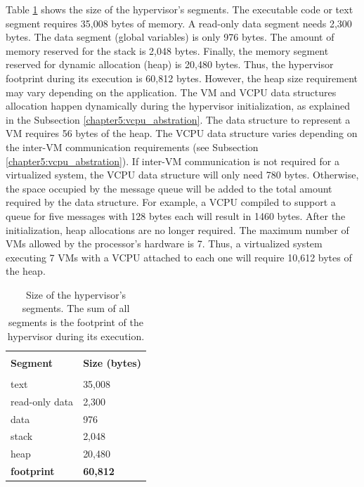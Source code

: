 Table \ref{table6:segments} shows the size of the hypervisor's segments. The executable code or text segment requires 35,008 bytes of memory. A read-only data segment needs 2,300 bytes. The data segment (global variables) is only 976 bytes. The amount of memory reserved for the stack is 2,048 bytes. Finally, the memory segment reserved for dynamic allocation (heap) is 20,480 bytes. Thus, the hypervisor footprint during its execution is 60,812 bytes. However, the heap size requirement may vary depending on the application. The VM and VCPU data structures allocation happen dynamically during the hypervisor initialization, as explained in the Subsection \ref{chapter5:vcpu_abstration}. The data structure to represent a VM requires 56 bytes of the heap. The VCPU data structure varies depending on the inter-VM communication requirements (see Subsection \ref{chapter5:vcpu_abstration}). If inter-VM communication is not required for a virtualized system, the VCPU data structure will only need 780 bytes. Otherwise, the space occupied by the message queue will be added to the total amount required by the data structure. For example, a VCPU compiled to support a queue for five messages with 128 bytes each will result in 1460 bytes. After the initialization, heap allocations are no longer required. The maximum number of VMs allowed by the processor's hardware is 7. Thus, a virtualized system executing 7 VMs with a VCPU attached to each one will require 10,612 bytes of the heap. 

\begin{table}[!hbtp]
\centering
\caption{Size of the hypervisor's segments. The sum of all segments is the footprint of the hypervisor during its execution.}
\label{table6:segments}
\begin{tabular}{p{6cm}l}
\hline \hline \\
\multicolumn{1}{l}{\textbf{Segment}} & \multicolumn{1}{l}{\textbf{Size (bytes)}} \\ \\ \hline
text                                 & 35,008                                     \\
read-only data                       & 2,300                                      \\
data                                 & 976                                       \\
stack                                & 2,048                                      \\
heap                                 & 20,480                                      \\ \hline
\textbf{footprint}                   & \textbf{60,812}                              \\ \hline
\end{tabular}
\end{table}

